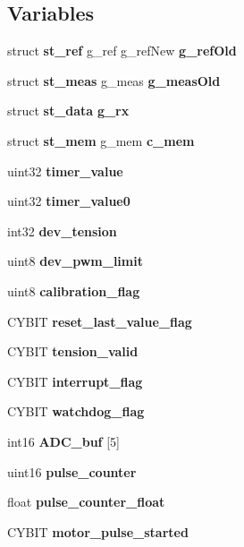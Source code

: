 \subsection*{Variables}
\begin{DoxyCompactItemize}
\item 
\mbox{\label{globals_8h_a158d26b6d15050b37d8039881d75e0dc}} 
struct \textbf{ st\+\_\+ref} g\+\_\+ref g\+\_\+ref\+New {\bfseries g\+\_\+ref\+Old}
\item 
\mbox{\label{globals_8h_a47c3980e6bddec492ca4315e36602ba0}} 
struct \textbf{ st\+\_\+meas} g\+\_\+meas {\bfseries g\+\_\+meas\+Old}
\item 
\mbox{\label{globals_8h_aa963ce8fafc11e104eb7ee22982d0345}} 
struct \textbf{ st\+\_\+data} {\bfseries g\+\_\+rx}
\item 
\mbox{\label{globals_8h_a44c3cbd8e234e0816f0334e29646a800}} 
struct \textbf{ st\+\_\+mem} g\+\_\+mem {\bfseries c\+\_\+mem}
\item 
\mbox{\label{globals_8h_ad47cd0e4d0fcf5739a88e52e949a8084}} 
uint32 {\bfseries timer\+\_\+value}
\item 
\mbox{\label{globals_8h_a9bab7f1b1cf2ba38d5968eee42644c32}} 
uint32 {\bfseries timer\+\_\+value0}
\item 
\mbox{\label{globals_8h_a53a494e9edc739a4f7c884778d1a93b1}} 
int32 {\bfseries dev\+\_\+tension}
\item 
\mbox{\label{globals_8h_a21f4f67e4203dea0b9956589eaa6cef3}} 
uint8 {\bfseries dev\+\_\+pwm\+\_\+limit}
\item 
\mbox{\label{globals_8h_afa36d7a54495dfdb796684539bf041a5}} 
uint8 {\bfseries calibration\+\_\+flag}
\item 
\mbox{\label{globals_8h_aa89a782cfe75ce7970236babd308fe69}} 
C\+Y\+B\+IT {\bfseries reset\+\_\+last\+\_\+value\+\_\+flag}
\item 
\mbox{\label{globals_8h_ac42fa606610c2600210d9b7b2c1d0882}} 
C\+Y\+B\+IT {\bfseries tension\+\_\+valid}
\item 
\mbox{\label{globals_8h_a1e6fda88dfdabc63859f8907eb702920}} 
C\+Y\+B\+IT {\bfseries interrupt\+\_\+flag}
\item 
\mbox{\label{globals_8h_a156a860c465529ff2f515725ab816a58}} 
C\+Y\+B\+IT {\bfseries watchdog\+\_\+flag}
\item 
\mbox{\label{globals_8h_ae87ec724f062d03e4f26473585e6a39f}} 
int16 {\bfseries A\+D\+C\+\_\+buf} [5]
\item 
\mbox{\label{globals_8h_adbb99439f0bdc2e7469e015d16b4d2c2}} 
uint16 {\bfseries pulse\+\_\+counter}
\item 
\mbox{\label{globals_8h_a0303b07a375125f93a5c178014ae0c6f}} 
float {\bfseries pulse\+\_\+counter\+\_\+float}
\item 
\mbox{\label{globals_8h_a9a9efe39376a01c0991cedc1a01c0540}} 
C\+Y\+B\+IT {\bfseries motor\+\_\+pulse\+\_\+started}
\end{DoxyCompactItemize}


